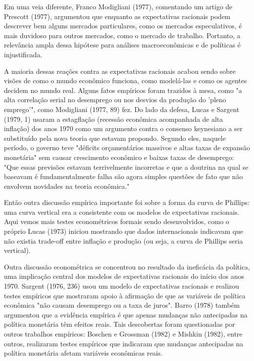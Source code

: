 \documentclass[a4paper,12pt]{article}[abntex2]
\begin{document}
Em uma veia diferente, Franco Modigliani (1977), comentando um artigo de Prescott (1977), argumentou que enquanto as expectativas racionais podem descrever bem alguns mercados particulares, como os mercados especulativos, é mais duvidoso para outros mercados, como o mercado de trabalho. Portanto, a relevância ampla dessa hipótese para análises macroeconômicas e de políticas é injustificada.

A maioria dessas reações contra as expectativas racionais acabou sendo sobre visões de como o mundo econômico funciona, como modelá-las e como os agentes decidem no mundo real. Alguns fatos empíricos foram trazidos à mesa, como "a alta correlação serial no desemprego ou nos desvios da produção do 'pleno emprego'", como Modigliani (1977, 89) fez. Do lado da defesa, Lucas e Sargent (1979, 1) usaram a estagflação (recessão econômica acompanhada de alta inflação) dos anos 1970 como um argumento contra o consenso keynesiano a ser substituído pela nova teoria que estavam propondo. Segundo eles, naquele período, o governo teve "déficits orçamentários massivos e altas taxas de expansão monetária" sem causar crescimento econômico e baixas taxas de desemprego: "Que essas previsões estavam terrivelmente incorretas e que a doutrina na qual se baseavam é fundamentalmente falha são agora simples questões de fato que não envolvem novidades na teoria econômica."

Então outra discussão empírica importante foi sobre a forma da curva de Phillips: uma curva vertical era a consistente com os modelos de expectativas racionais. Aqui vemos mais testes econométricos formais sendo desenvolvidos, como o próprio Lucas (1973) iniciou mostrando que dados internacionais indicavam que não existia trade-off entre inflação e produção (ou seja, a curva de Phillips seria vertical).

Outra discussão econométrica se concentrou no resultado da ineficácia da política, uma implicação central dos modelos de expectativas racionais do início dos anos 1970. Sargent (1976, 236) usou um modelo de expectativas racionais e realizou testes empíricos que mostraram apoio à afirmação de que as variáveis de política econômica "não causam desemprego ou a taxa de juros". Barro (1978) também argumentou que a evidência empírica é que apenas mudanças não antecipadas na política monetária têm efeitos reais. Tais descobertas foram questionadas por outros trabalhos empíricos: Boschen e Grossman (1982) e Mishkin (1982), entre outros, realizaram testes empíricos que indicaram que mudanças antecipadas na política monetária afetam variáveis econômicas reais.
\end{document}
